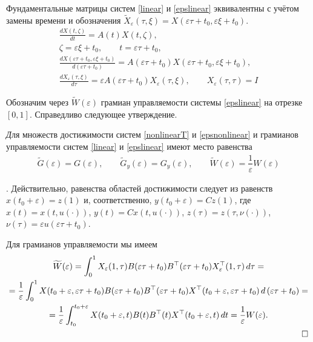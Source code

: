 \documentclass[../main.tex]{subfiles}
\begin{document}
Фундаментальные матрицы систем \eqref{linear} и \eqref{epslinear} эквивалентны с учётом замены времени и обозначения $ \widetilde{X}_{\varepsilon}(\tau,\xi) = X(\varepsilon \tau + t_0,\varepsilon \xi + t_0) $.
\begin{gather*}
	\frac{dX(t,\zeta)}{dt} = A(t) X(t,\zeta), \\
	\zeta = \varepsilon \xi + t_0, \qquad t = \varepsilon \tau + t_0, \\
	\frac{dX(\varepsilon \tau + t_0,\varepsilon \xi + t_0)}{d(\varepsilon \tau + t_0)} = A(\varepsilon \tau + t_0) X(\varepsilon \tau + t_0,\varepsilon \xi + t_0), \\
	\frac{dX_{ \varepsilon}(\tau,\xi)}{d\tau} = \varepsilon A(\varepsilon \tau + t_0) X_{ \varepsilon}(\tau,\xi), \qquad X_{\varepsilon}(\tau,\tau) = I
\end{gather*}

Обозначим через $ \widetilde{W}(\varepsilon) $ грамиан управляемости системы \eqref{epslinear} на отрезке $ [0,1] $. Справедливо следующее утверждение.

\begin{utv}\label{utv}
	{\textit Для множеств достижимости систем \eqref{nonlinearT} и \eqref{epsnonlinear} и грамианов управляемости систем \eqref{linear} и \eqref{epslinear} имеют место равенства}
	\begin{gather*}
		\widetilde{G}(\varepsilon)=G(\varepsilon), \qquad \widetilde{G}_y(\varepsilon)=G_y(\varepsilon), \qquad
		\widetilde{W}(\varepsilon) = \dfrac{1}{\varepsilon} W(\varepsilon)
	\end{gather*}
\end{utv}

\doc. 
Действительно, равенства областей достижимости следует из равенств $ x(t_0 + \varepsilon) = z(1) $ и, соответственно, $ y(t_0+\varepsilon) = C z(1) $, где $ x(t) = x(t,u(\cdot)) $, $ y(t) = C x(t,u(\cdot)) $, $ z(\tau) = z(\tau,\nu(\cdot))  $, $ \nu(\tau) = \varepsilon u(\varepsilon \tau + t_0)  $.

Для грамианов управляемости мы имеем
\begin{gather*}
	\begin{gathered}
		\widetilde{W}(\varepsilon) =
		\int_0^1
		X_{ \varepsilon} (1,\tau)
		B(\varepsilon \tau + t_0)
		B^{\top}(\varepsilon \tau + t_0)
		X_{ \varepsilon}^{\top} (1,\tau) \, d\tau = \\
		= \dfrac{1}{\varepsilon}\int_0^1
		X(t_0+\varepsilon,\varepsilon \tau + t_0)
		B(\varepsilon \tau + t_0)
		B^{\top}(\varepsilon \tau + t_0)
		X^{\top}(t_0+\varepsilon,\varepsilon \tau + t_0) \,
		d\left( \varepsilon\tau + t_0\right) = \\ =
		\dfrac{1}{\varepsilon} \int_{t_0}^{t_0+\varepsilon}
		X(t_0+\varepsilon,t)
		B(t)
		B^{\top}(t)
		X^{\top}(t_0+\varepsilon,t) \, dt = \dfrac{1}{\varepsilon} W(\varepsilon). \\ \hfill \square
	\end{gathered}
\end{gather*}
\end{document}
